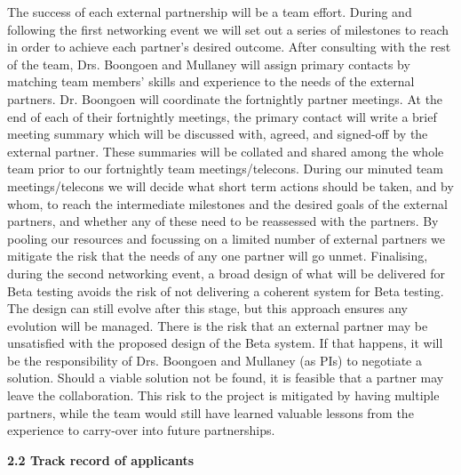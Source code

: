 \documentclass[11pt]{article}
\begin{document}
  \noindent
  The success of each external partnership will be a team effort. During and following the first networking event we will set out a series of milestones to reach in order to achieve each partner's desired outcome. After consulting with the rest of the team, Drs. Boongoen and Mullaney will assign primary contacts by matching team members' skills and experience to the needs of the external partners. Dr. Boongoen will coordinate the fortnightly partner meetings. At the end of each of their fortnightly meetings, the primary contact will write a brief meeting summary which will be discussed with, agreed, and signed-off by the external partner. These summaries will be collated and shared among the whole team prior to our fortnightly team meetings/telecons. During our minuted team meetings/telecons we will decide what short term actions should be taken, and by whom, to reach the intermediate milestones and the desired goals of the external partners, and whether any of these need to be reassessed with the partners. By pooling our resources and focussing on a limited number of external partners we mitigate the risk that the needs of any one partner will go unmet. Finalising, during the second networking event, a broad design of what will be delivered for Beta testing avoids the risk of not delivering a coherent system for Beta testing. The design can still evolve after this stage, but this approach ensures any evolution will be managed. There is the risk that an external partner may be unsatisfied with the proposed design of the Beta system. If that happens, it will be the responsibility of Drs. Boongoen and Mullaney (as PIs) to negotiate a solution. Should a viable solution not be found, it is feasible that a partner may leave the collaboration. This risk to the project is mitigated by having multiple partners, while the team would still have learned valuable lessons from the experience to carry-over into future partnerships.
    
  \vspace{3mm}
  \noindent
  {\large \bf 2.2 Track record of applicants}
  
\end{document}
